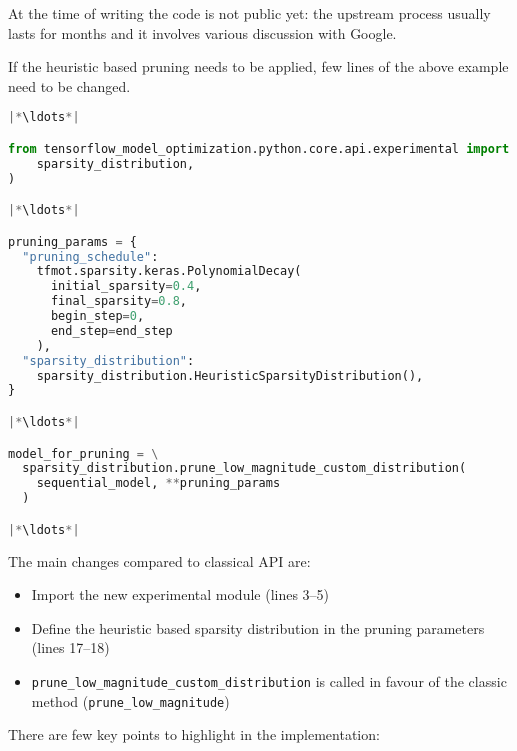 At the time of writing the code is not public yet: the upstream process usually
lasts for months and it involves various discussion with Google.

If the heuristic based pruning needs to be applied, few lines of the above
example need to be changed.

\begin{lstlisting}[language=Python, caption=Pruning with Heuristic]
|*\ldots*|

from tensorflow_model_optimization.python.core.api.experimental import (
    sparsity_distribution,
)

|*\ldots*|

pruning_params = {
  "pruning_schedule":
    tfmot.sparsity.keras.PolynomialDecay(
      initial_sparsity=0.4,
      final_sparsity=0.8,
      begin_step=0,
      end_step=end_step
    ),
  "sparsity_distribution":
    sparsity_distribution.HeuristicSparsityDistribution(),
}

|*\ldots*|

model_for_pruning = \
  sparsity_distribution.prune_low_magnitude_custom_distribution(
    sequential_model, **pruning_params
  )

|*\ldots*|
\end{lstlisting}

The main changes compared to classical API are:

\begin{itemize}
    \item Import the new experimental module (lines 3--5)
    \item Define the heuristic based sparsity distribution in the pruning
        parameters (lines 17--18)
    \item \texttt{prune\_low\_magnitude\_custom\_distribution} is called in
        favour of the classic method (\texttt{prune\_low\_magnitude})
\end{itemize}

There are few key points to highlight in the implementation:

